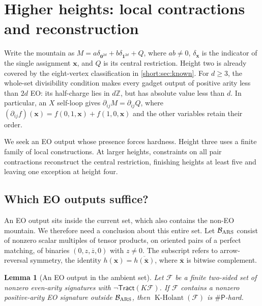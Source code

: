 \documentclass[11pt,letterpaper,onecolumn]{article}
\theoremstyle{plain}
\newtheorem{lemma}[lemma]{Lemma}
\theoremstyle{definition}
\theoremstyle{remark}
\newcommand{\cF}{\mathcal F}
\newcommand{\KHolant}{\operatorname{K\text{-}Holant}}
\newcommand{\Tract}{\mathsf{Tract}}
\newcommand{\SharpP}{\#\mathsf P}
\newcommand{\one}{\mathbf 1}
\newcommand{\zero}{\mathbf 0}
\begin{document}
\section{Higher heights: local contractions and reconstruction}
\label{short:sec:higher}

Write the mountain as
\(M=a\delta_{\zero^{2d}}+b\delta_{\one^{2d}}+Q\), where \(ab\ne0\),
\(\delta_{\mathbf x}\) is the indicator of the single assignment
\(\mathbf x\), and \(Q\) is its central restriction. Height two is
already covered by the eight-vertex classification in
\cref{short:sec:known}. For \(d\ge3\), the whole-set divisibility
condition makes every gadget output of positive arity less than \(2d\)
EO: its half-charge lies in \(d\mathbb Z\), but has absolute value less
than \(d\). In particular, an \(X\) self-loop gives
\(\partial_{ij}M=\partial_{ij}Q\), where
\((\partial_{ij}f)(\mathbf x)=f(0,1,\mathbf x)+f(1,0,\mathbf x)\)
and the other variables retain their order.

We seek an EO output whose presence forces hardness. Height three uses
a finite family of local constructions. At larger heights, constraints
on all pair contractions reconstruct the central restriction, finishing
heights at least five and leaving one exception at height four.

\subsection{Which EO outputs suffice?}

An EO output sits inside the current set, which also contains the
non-EO mountain. We therefore need a conclusion about this entire set.
Let \(\mathcal B_{\rm ARS}\) consist of nonzero scalar multiples of
tensor products, on oriented pairs of a perfect matching, of binaries
\((0,z,\overline z,0)\) with \(z\ne0\). The subscript refers to
arrow-reversal symmetry, the identity
\(h(\mathbf x)=\overline{h(\overline{\mathbf x})}\), where
\(\overline{\mathbf x}\) is bitwise complement.

\begin{lemma}[An EO output in the ambient set]
\label{short:lem:relative-eo}
Let \(\cF\) be a finite two-sided set of nonzero even-arity signatures
with \(\neg\Tract(K\cF)\). If \(\cF\) contains a nonzero positive-arity
EO signature outside \(\mathcal B_{\rm ARS}\), then
\(\KHolant(\cF)\) is \(\SharpP\)-hard.
\end{lemma}
\end{document}
